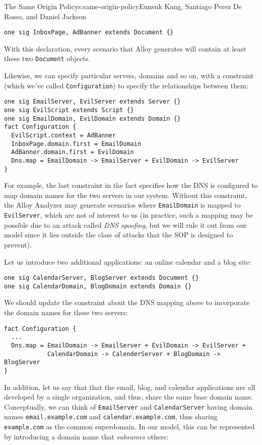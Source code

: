 \begin{aosachapter}{The Same Origin Policy}{s:same-origin-policy}{Eunsuk Kang, Santiago Perez De Rosso, and Daniel Jackson}
\begin{verbatim}
one sig InboxPage, AdBanner extends Document {}
\end{verbatim}

With this declaration, every scenario that Alloy generates will contain
at least these two \texttt{Document} objects.

Likewise, we can specify particular servers, domains and so on, with a
constraint (which we've called \texttt{Configuration}) to specify the
relationships between them:

\begin{verbatim}
one sig EmailServer, EvilServer extends Server {}
one sig EvilScript extends Script {}
one sig EmailDomain, EvilDomain extends Domain {}
fact Configuration {
  EvilScript.context = AdBanner
  InboxPage.domain.first = EmailDomain
  AdBanner.domain.first = EvilDomain  
  Dns.map = EmailDomain -> EmailServer + EvilDomain -> EvilServer
}
\end{verbatim}

For example, the last constraint in the fact specifies how the DNS is
configured to map domain names for the two servers in our system.
Without this constraint, the Alloy Analyzer may generate scenarios where
\texttt{EmailDomain} is mapped to \texttt{EvilServer}, which are not of
interest to us (in practice, such a mapping may be possible due to an
attack called \emph{DNS spoofing}, but we will rule it out from our
model since it lies outside the class of attacks that the SOP is
designed to prevent).

Let us introduce two additional applications: an online calendar and a
blog site:

\begin{verbatim}
one sig CalendarServer, BlogServer extends Document {} 
one sig CalendarDomain, BlogDomain extends Domain {}
\end{verbatim}

We should update the constraint about the DNS mapping above to
incorporate the domain names for these two servers:

\begin{verbatim}
fact Configuration {
  ...
  Dns.map = EmailDomain -> EmailServer + EvilDomain -> EvilServer + 
            CalendarDomain -> CalenderServer + BlogDomain -> BlogServer  
}
\end{verbatim}

In addition, let us say that that the email, blog, and calendar
applications are all developed by a single organization, and thus, share
the same base domain name. Conceptually, we can think of
\texttt{EmailServer} and \texttt{CalendarServer} having domain names
\texttt{email.example.com} and \texttt{calendar.example.com}, thus
sharing \texttt{example.com} as the common superdomain. In our model,
this can be represented by introducing a domain name that
\emph{subsumes} others:


\end{aosachapter}
